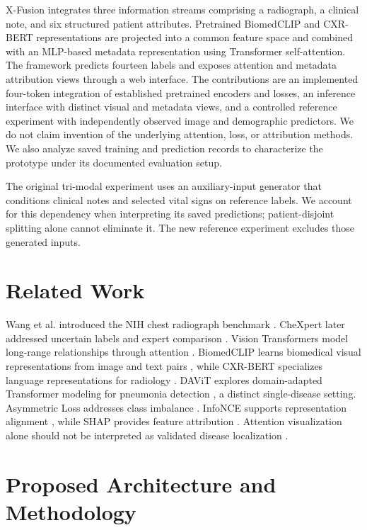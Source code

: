 \documentclass[runningheads,a4paper]{llncs}
\begin{document}
X-Fusion integrates three information streams comprising a radiograph, a clinical note, and six structured patient attributes. Pretrained BiomedCLIP and CXR-BERT representations are projected into a common feature space and combined with an MLP-based metadata representation using Transformer self-attention. The framework predicts fourteen labels and exposes attention and metadata attribution views through a web interface. The contributions are an implemented four-token integration of established pretrained encoders and losses, an inference interface with distinct visual and metadata views, and a controlled reference experiment with independently observed image and demographic predictors. We do not claim invention of the underlying attention, loss, or attribution methods. We also analyze saved training and prediction records to characterize the prototype under its documented evaluation setup.



The original tri-modal experiment uses an auxiliary-input generator that conditions clinical notes and selected vital signs on reference labels. We account for this dependency when interpreting its saved predictions; patient-disjoint splitting alone cannot eliminate it. The new reference experiment excludes those generated inputs.

\section{Related Work}

Wang et al. introduced the NIH chest radiograph benchmark \cite{wang2017}. CheXpert later addressed uncertain labels and expert comparison \cite{irvin2019}. Vision Transformers model long-range relationships through attention \cite{dosovitskiy2021,vaswani2017}. BiomedCLIP learns biomedical visual representations from image and text pairs \cite{biomedclip2023}, while CXR-BERT specializes language representations for radiology \cite{cxrbert2022}. DAViT explores domain-adapted Transformer modeling for pneumonia detection \cite{davit2025}, a distinct single-disease setting. Asymmetric Loss addresses class imbalance \cite{ridnik2021}. InfoNCE supports representation alignment \cite{oord2018}, while SHAP provides feature attribution \cite{lundberg2017}. Attention visualization alone should not be interpreted as validated disease localization \cite{chefer2021}.

\section{Proposed Architecture and Methodology}
\end{document}
